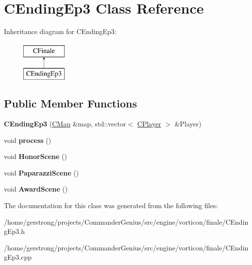 \hypertarget{class_c_ending_ep3}{
\section{CEndingEp3 Class Reference}
\label{class_c_ending_ep3}
}
Inheritance diagram for CEndingEp3:\begin{figure}[H]
\begin{center}
\leavevmode
\includegraphics[height=2cm]{class_c_ending_ep3}
\end{center}
\end{figure}
\subsection*{Public Member Functions}
\begin{DoxyCompactItemize}
\item 
\hypertarget{class_c_ending_ep3_aa861ef9f4542707be934281bb7ac8833}{
{\bfseries CEndingEp3} (\hyperlink{class_c_map}{CMap} \&map, std::vector$<$ \hyperlink{class_c_player}{CPlayer} $>$ \&Player)}
\label{class_c_ending_ep3_aa861ef9f4542707be934281bb7ac8833}

\item 
\hypertarget{class_c_ending_ep3_a57b519c755b5c5adbaf321ca1295ca99}{
void {\bfseries process} ()}
\label{class_c_ending_ep3_a57b519c755b5c5adbaf321ca1295ca99}

\item 
\hypertarget{class_c_ending_ep3_af52d0517b8dd67d77460e1a1170b519a}{
void {\bfseries HonorScene} ()}
\label{class_c_ending_ep3_af52d0517b8dd67d77460e1a1170b519a}

\item 
\hypertarget{class_c_ending_ep3_a3cc2d168fb5cbfab6e89d6ae82e30501}{
void {\bfseries PaparazziScene} ()}
\label{class_c_ending_ep3_a3cc2d168fb5cbfab6e89d6ae82e30501}

\item 
\hypertarget{class_c_ending_ep3_aa090ef835819ecb2ac52322733ba63a8}{
void {\bfseries AwardScene} ()}
\label{class_c_ending_ep3_aa090ef835819ecb2ac52322733ba63a8}

\end{DoxyCompactItemize}


The documentation for this class was generated from the following files:\begin{DoxyCompactItemize}
\item 
/home/gerstrong/projects/CommanderGenius/src/engine/vorticon/finale/CEndingEp3.h\item 
/home/gerstrong/projects/CommanderGenius/src/engine/vorticon/finale/CEndingEp3.cpp\end{DoxyCompactItemize}

